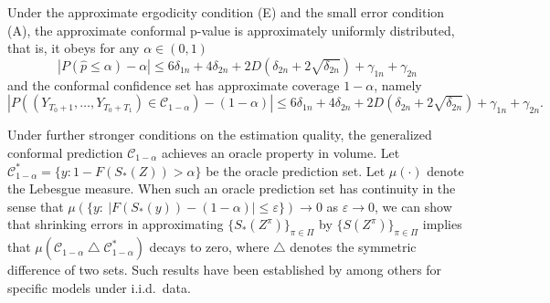 \documentclass[final,12pt]{colt2018} %
\newcommand{\yinchu}[1]{\textcolor{teal}{Yinchu: #1}}
\begin{document}
\begin{theorem}\label{thm: high level new}
Under the approximate ergodicity condition (E) and the small error condition (A), the approximate conformal p-value is approximately uniformly distributed, that is, it obeys for any $\alpha\in(0,1)$ 
$$\left|P\left(\hat{p}\leq\alpha\right)- \alpha \right|  \leq 6\delta_{1n}+ 4 \delta_{2n}+ 2 D(\delta_{2n}+ 2\sqrt{\delta_{2n}}) +\gamma_{1n}+\gamma_{2n}
$$
and the conformal confidence set has approximate coverage $1-\alpha$, namely
$$ \left| P((Y_{T_0+1},\dots,Y_{T_0+T_1}) \in \mathcal{C}_{1-\alpha}) -(1-\alpha)\right| \leq  6\delta_{1n}+ 4 \delta_{2n}+ 2 D(\delta_{2n}+ 2\sqrt{\delta_{2n}}) +\gamma_{1n}+\gamma_{2n}. $$
\end{theorem}



















Under further stronger conditions on the estimation quality, the generalized conformal prediction $\mathcal{C}_{1-\alpha} $ achieves an oracle property in volume. Let $ \mathcal{C}_{1-\alpha}^*=\{y: 1-F(S_*(Z)) > \alpha \} $ be the oracle prediction set. Let $\mu(\cdot)$ denote the Lebesgue measure. When such an oracle prediction set has continuity in the sense that $\mu(\{y:\ |F(S_*(y))-(1-\alpha)|\leq \varepsilon \}) \rightarrow 0$ as $\varepsilon\rightarrow 0$, we can show that shrinking errors in approximating $\{S_*(Z^\pi)\}_{\pi\in \Pi} $ by $\{S(Z^\pi)\}_{\pi\in \Pi} $ implies that $\mu(\mathcal{C}_{1-\alpha} \bigtriangleup \mathcal{C}_{1-\alpha}^*)$ decays to zero,  where $ \bigtriangleup  $ denotes the symmetric difference of two sets. Such results have been established by \cite{lei2013distribution} among others for specific models under i.i.d.\ data.
\end{document}
